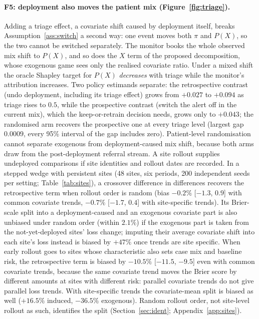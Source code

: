 \documentclass[letterpaper]{article} %
\begin{document}
\paragraph{F5: deployment also moves the patient mix
(Figure~\ref{fig:triage}).} Adding a triage effect, a covariate shift caused by
deployment itself, breaks Assumption~\ref{ass:switch} a second way: one event
moves both $\pi$ and $P(X)$, so the two cannot be switched separately. The
monitor books the whole
observed mix shift to $P(X)$, and so does the $X$ term of the proposed
decomposition, whose exogenous game sees only the realised covariate ratio.
Under a mixed shift the oracle Shapley target for $P(X)$ \emph{decreases} with
triage while the
monitor's attribution increases. Two policy estimands separate: the
retrospective contrast (undo deployment, including its triage effect) grows
from $+0.027$ to $+0.094$ as triage rises to $0.5$, while the prospective
contrast (switch the alert off in the current mix), which the keep-or-retrain
decision needs, grows only to $+0.043$; the randomised arm recovers the
prospective one at every triage level (largest gap $0.0009$, every 95\% interval of the gap includes zero). Patient-level randomisation cannot
separate exogenous from deployment-caused mix shift, because both arms draw
from the post-deployment referral stream. A site rollout supplies undeployed
comparisons if site identities and rollout dates are recorded. In a stepped
wedge with persistent sites (48 sites, six periods, 200 independent
seeds per setting; Table~\ref{tab:sites}), a crossover difference in
differences recovers the retrospective term when rollout order is random (bias
$-0.2\%$ [$-1.3$, $0.9$] with common covariate trends, $-0.7\%$ [$-1.7$, $0.4$]
with site-specific trends). Its Brier-scale split into a deployment-caused and
an exogenous covariate part is also unbiased under random order (within
$2.1\%$) if the exogenous part is taken from the not-yet-deployed sites' loss
change; imputing their average covariate shift into each site's loss instead
is biased by $+47\%$ once trends are site specific. When early rollout goes to
sites whose characteristic also sets case mix and baseline risk, the
retrospective term is biased by $-10.5\%$ [$-11.5$, $-9.5$] even with common
covariate trends, because the same covariate trend moves the Brier score by
different amounts at sites with different risk: parallel covariate trends do
not give parallel loss trends. With site-specific trends the covariate-mean
split is biased as well ($+16.5\%$ induced, $-36.5\%$ exogenous). Random
rollout order, not site-level rollout as such, identifies the split
(Section~\ref{sec:ident}; Appendix~\ref{app:sites}).
\end{document}
